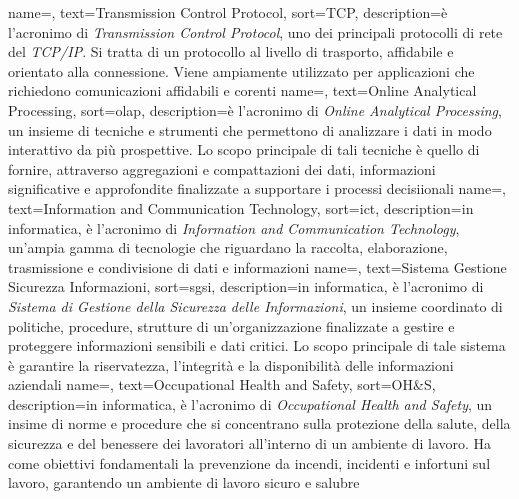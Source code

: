  {
    name=,
    text=Transmission Control Protocol,
    sort=TCP,
    description={è l'acronimo di \textit{Transmission Control Protocol}, uno dei principali protocolli di rete del \textit{TCP/IP}. Si tratta di un 
    protocollo al livello di trasporto, affidabile e orientato alla connessione. Viene ampiamente utilizzato per applicazioni 
    che richiedono comunicazioni affidabili e corenti}
}
 {
    name=,
    text=Online Analytical Processing,
    sort=olap,
    description={è l'acronimo di \textit{Online Analytical Processing}, un insieme di tecniche e strumenti che permettono di analizzare i dati in modo 
    interattivo da più prospettive. Lo scopo principale di tali tecniche è quello di fornire, attraverso aggregazioni e compattazioni dei dati, informazioni 
    significative e approfondite finalizzate a supportare i processi decisiionali
    }
}
 {
    name=,
    text=Information and Communication Technology,
    sort=ict,
    description={in informatica, è l'acronimo di \textit{Information and Communication Technology}, un'ampia gamma di tecnologie che riguardano la raccolta, 
    elaborazione, trasmissione e condivisione di dati e informazioni}
}
 {
    name=,
    text=Sistema Gestione Sicurezza Informazioni,
    sort=sgsi,
    description={in informatica, è l'acronimo di \textit{Sistema di Gestione della Sicurezza delle Informazioni}, un insieme coordinato di politiche, procedure, strutture di un'organizzazione finalizzate a 
    gestire e proteggere informazioni sensibili e dati critici. Lo scopo principale di tale sistema è garantire la riservatezza, l'integrità 
    e la disponibilità delle informazioni aziendali}
}
 {
    name=,
    text=Occupational Health and Safety,
    sort=OH\&S,
    description={in informatica, è l'acronimo di \textit{Occupational Health and Safety}, un insime di norme e procedure che si concentrano 
    sulla protezione della salute, della sicurezza e del benessere dei lavoratori all'interno di un ambiente di lavoro. Ha come obiettivi 
    fondamentali la prevenzione da incendi, incidenti e infortuni sul lavoro, garantendo un ambiente di lavoro sicuro e salubre}
}
